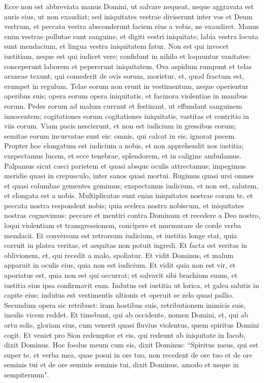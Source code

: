 \begin{biblechapter}  
\verse Ecce non est abbreviata manus Domini, ut salvare nequeat, neque aggravata est auris eius, ut non exaudiat; 
\verse sed iniquitates vestrae diviserunt inter vos et Deum vestrum, et peccata vestra absconderunt faciem eius a vobis, ne exaudiret. 
\verse Manus enim vestrae pollutae sunt sanguine, et digiti vestri iniquitate; labia vestra locuta sunt mendacium, et lingua vestra iniquitatem fatur. 
\verse Non est qui invocet iustitiam, neque est qui iudicet vere; confidunt in nihilo et loquuntur vanitates: conceperunt laborem et pepererunt iniquitatem. 
\verse Ova aspidum rumpunt et telas araneae texunt; qui comederit de ovis eorum, morietur, et, quod fractum est, erumpet in regulum. 
\verse Telae eorum non erunt in vestimentum, neque operientur operibus suis; opera eorum opera iniquitatis, et facinora violentiae in manibus eorum. 
\verse Pedes eorum ad malum currunt et festinant, ut effundant sanguinem innocentem; cogitationes eorum cogitationes iniquitatis, vastitas et contritio in viis eorum. 
\verse Viam pacis nescierunt, et non est iudicium in gressibus eorum; semitae eorum incurvatae sunt eis: omnis, qui calcat in eis, ignorat pacem. 
\verse Propter hoc elongatum est iudicium a nobis, et non apprehendit nos iustitia; exspectamus lucem, et ecce tenebrae, splendorem, et in caligine ambulamus. 
\verse Palpamus sicut caeci parietem et quasi absque oculis attrectamus; impegimus meridie quasi in crepusculo, inter sanos quasi mortui. 
\verse Rugimus quasi ursi omnes et quasi columbae gementes gemimus; exspectamus iudicium, et non est, salutem, et elongata est a nobis. 
\verse Multiplicatae sunt enim iniquitates nostrae coram te, et peccata nostra respondent nobis; quia scelera nostra nobiscum, et iniquitates nostras cognovimus: 
\verse peccare et mentiri contra Dominum et recedere a Deo nostro, loqui violentiam et transgressionem, concipere et murmurare de corde verba mendacii. 
\verse Et conversum est retrorsum iudicium, et iustitia longe stat, quia corruit in platea veritas, et aequitas non potuit ingredi. 
\verse Et facta est veritas in oblivionem, et, qui recedit a malo, spoliatur. Et vidit Dominus, et malum apparuit in oculis eius, quia non est iudicium. 
\verse Et vidit quia non est vir, et aporiatus est, quia non est qui occurrat; et salvavit sibi brachium suum, et iustitia eius ipsa confirmavit eum. 
\verse Indutus est iustitia ut lorica, et galea salutis in capite eius; indutus est vestimentis ultionis et operuit se zelo quasi pallio. 
\verse Secundum opera sic retribuet: iram hostibus suis, retributionem inimicis suis, insulis vicem reddet. 
\verse Et timebunt, qui ab occidente, nomen Domini, et, qui ab ortu solis, gloriam eius, cum venerit quasi fluvius violentus, quem spiritus Domini cogit. 
\verse Et veniet pro Sion redemptor et eis, qui redeunt ab iniquitate in Iacob, dixit Dominus. 
\verse Hoc foedus meum cum eis, dixit Dominus: “Spiritus meus, qui est super te, et verba mea, quae posui in ore tuo, non recedent de ore tuo et de ore seminis tui et de ore seminis seminis tui, dixit Dominus, amodo et usque in sempiternum". 
\end{biblechapter}


